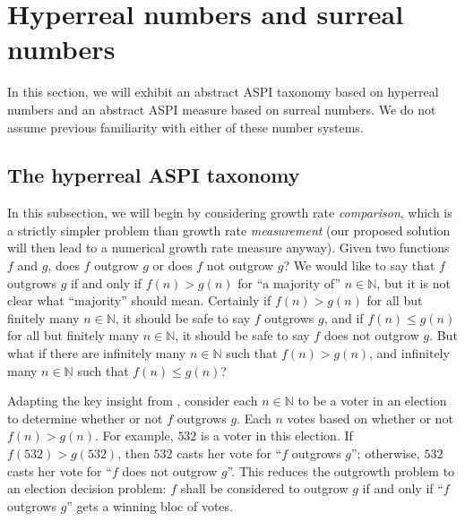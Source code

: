 \documentclass[twoside,11pt]{article}
\begin{document}
\section{Hyperreal numbers and surreal numbers}
\label{hyperrealsurrealsection}

In this section, we will exhibit an abstract ASPI taxonomy based on hyperreal numbers
and an abstract ASPI measure based on surreal numbers. We do not assume previous
familiarity with either of these number systems.

\subsection{The hyperreal ASPI taxonomy}
\label{hyperrealsubsection}

In this subsection, we will begin by considering growth rate \emph{comparison}, which is
a strictly simpler problem than growth rate \emph{measurement} (our proposed solution will
then lead to a numerical growth rate measure anyway). Given two functions $f$
and $g$, does $f$ outgrow $g$ or does $f$ not outgrow $g$? We would like to say that
$f$ outgrows $g$ if and only if $f(n)>g(n)$ for ``a majority of'' $n\in\mathbb N$, but it is
not clear what ``majority'' should mean. Certainly if $f(n)>g(n)$ for all but finitely many
$n\in\mathbb N$, it should be safe to say $f$ outgrows $g$, and if $f(n)\leq g(n)$ for
all but finitely many $n\in\mathbb N$, it should be safe to say $f$ does not outgrow
$g$. But what if there are infinitely many $n\in\mathbb N$ such that $f(n)>g(n)$, and
infinitely many $n\in\mathbb N$ such that $f(n)\leq g(n)$?

Adapting the key insight from \citet{alexander2019intelligence}, consider each $n\in\mathbb N$
to be a voter in an election to determine whether or not $f$ outgrows $g$.
Each $n$ votes based on whether or not $f(n)>g(n)$. For example, $532$ is a voter in this
election. If $f(532)>g(532)$, then $532$ casts her vote for ``$f$ outgrows $g$''; otherwise,
$532$ casts her vote for ``$f$ does not outgrow $g$''. This reduces the outgrowth problem
to an election decision problem: $f$ shall be considered to outgrow $g$ if and only if
``$f$ outgrows $g$'' gets a winning bloc of votes.
\end{document}

